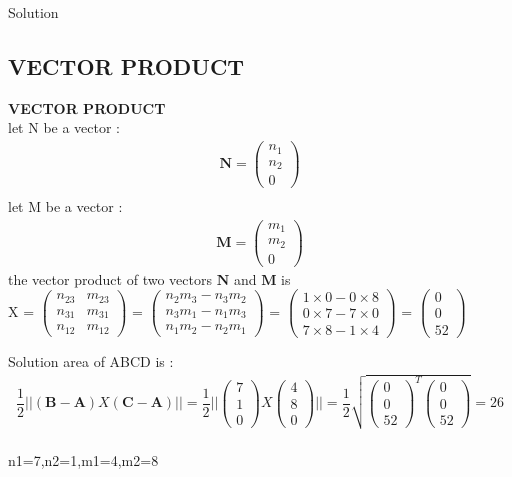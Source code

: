 \documentclass{beamer}
\let\vec\mathbf
\theoremstyle{remark}
\newcommand{\myvec}[1]{\ensuremath{\begin{pmatrix}#1\end{pmatrix}}}
\numberwithin{equation}{section}
\begin{document}
\begin{frame}{Solution}
\subsection{VECTOR PRODUCT }
\textbf{VECTOR PRODUCT}
\\
let N be a vector :
\begin{align}
    \vec{N}=\myvec{n_1\\n_2\\0}
    \\
    \end{align}
    let M be a vector :
    \begin{align}
    \vec{M}=\myvec{m_1\\m_2\\0}
\end{align}
the vector product of two vectors $\vec{N}$ and $\vec{M}$ is 
\\
\vec{N}X\vec{M} =
\myvec{
n_{23} & m_{23} \\
n_{31} & m_{31} \\
n_{12} & m_{12}
}
=
\myvec{
n_2 m_3 - n_3 m_2 \\
n_3 m_1 - n_1 m_3 \\
n_1 m_2 - n_2 m_1
}
=
\myvec{
1 \times 0 - 0 \times 8 \\
0 \times 7 - 7 \times 0 \\
7 \times 8 - 1 \times 4
}
=
\myvec{
0 \\
0 \\
52
}
\end{frame}
\begin{frame}{Solution}
{area of ABCD is :}
\begin{align*}
     \dfrac{1}{2}||(\vec{B}-  \vec{A})X(\vec{C} -  \vec{A})||=\dfrac{1}{2}||\myvec{7\\1\\0}X\myvec{4\\8\\0}||= \dfrac{1}{2}\sqrt{\myvec{0\\0\\52}^T\myvec{0\\0\\52}}=26
    \end{align*}
    \\
    n1=7,n2=1,m1=4,m2=8

\end{frame}
\end{document}
